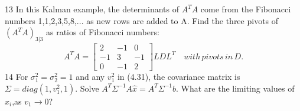 13\; In this Kalman example, the determinants of $A^TA$ come from the Fibonacci numbers
1,1,2,3,5,8,... as new rows are added to A. Find the three pivots of $(A^TA)_{3|3}$ as
ratios of Fibonacci numbers:
\begin{equation*}
A^TA=
\begin{bmatrix}
2&-1&0\\
-1&3&-1\\
0&-1&2
\end{bmatrix}
LDL^T  \quad with\,pivots\,in\,D.
\end{equation*} 	
14\; For $\sigma^2_1=\sigma^2_2=1$ and any $v^2_1$ in (4.31), the covariance matrix is $\Sigma=diag(1,v^2_1,1)$. Solve $A^T\Sigma^{-1}A\hat{x}=A^T\Sigma^{-1}b$. What are the limiting values of $\hat{x}_i$,as $v_1\rightarrow 0$?	
